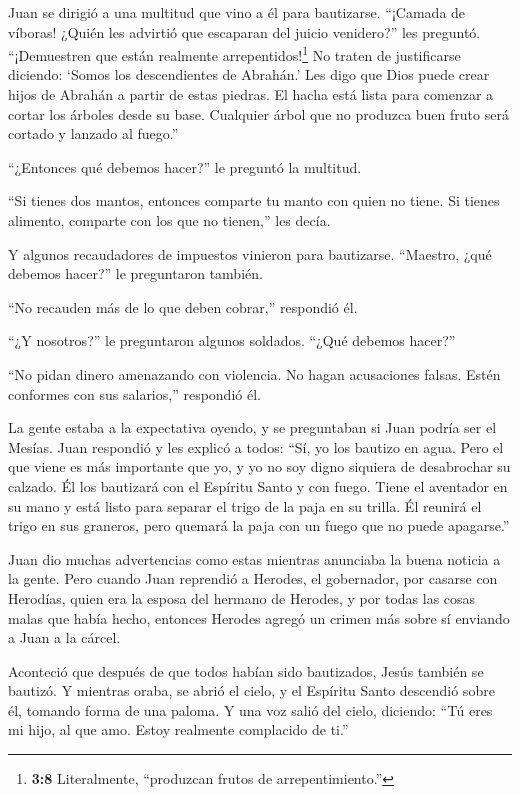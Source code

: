  Juan se dirigió a una multitud que vino a él para
bautizarse. ``¡Camada de víboras! ¿Quién les advirtió que escaparan del
juicio venidero?'' les preguntó.  ``¡Demuestren que están
realmente arrepentidos!\footnote{\textbf{3:8} Literalmente, ``produzcan
  frutos de arrepentimiento.''} No traten de justificarse diciendo:
`Somos los descendientes de Abrahán.' Les digo que Dios puede crear
hijos de Abrahán a partir de estas piedras.  El hacha está
lista para comenzar a cortar los árboles desde su base. Cualquier árbol
que no produzca buen fruto será cortado y lanzado al fuego.''

 ``¿Entonces qué debemos hacer?'' le preguntó la multitud.

 ``Si tienes dos mantos, entonces comparte tu manto con
quien no tiene. Si tienes alimento, comparte con los que no tienen,''
les decía.

 Y algunos recaudadores de impuestos vinieron para
bautizarse. ``Maestro, ¿qué debemos hacer?'' le preguntaron también.

 ``No recauden más de lo que deben cobrar,'' respondió él.

 ``¿Y nosotros?'' le preguntaron algunos soldados. ``¿Qué
debemos hacer?''

``No pidan dinero amenazando con violencia. No hagan acusaciones falsas.
Estén conformes con sus salarios,'' respondió él.

 La gente estaba a la expectativa oyendo, y se preguntaban
si Juan podría ser el Mesías.  Juan respondió y les explicó
a todos: ``Sí, yo los bautizo en agua. Pero el que viene es más
importante que yo, y yo no soy digno siquiera de desabrochar su calzado.
Él los bautizará con el Espíritu Santo y con fuego.  Tiene
el aventador en su mano y está listo para separar el trigo de la paja en
su trilla. Él reunirá el trigo en sus graneros, pero quemará la paja con
un fuego que no puede apagarse.''

 Juan dio muchas advertencias como estas mientras anunciaba
la buena noticia a la gente.  Pero cuando Juan reprendió a
Herodes, el gobernador, por casarse con Herodías, quien era la esposa
del hermano de Herodes, y por todas las cosas malas que había hecho,
 entonces Herodes agregó un crimen más sobre sí enviando a
Juan a la cárcel.

 Aconteció que después de que todos habían sido bautizados,
Jesús también se bautizó. Y mientras oraba, se abrió el cielo,
 y el Espíritu Santo descendió sobre él, tomando forma de
una paloma. Y una voz salió del cielo, diciendo: ``Tú eres mi hijo, al
que amo. Estoy realmente complacido de ti.''


